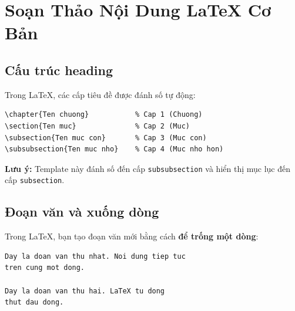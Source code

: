 
\chapter{Soạn Thảo Nội Dung \LaTeX{} Cơ Bản}
\label{ch:basics}

\section{Cấu trúc heading}

Trong \LaTeX{}, các cấp tiêu đề được đánh số tự động:

\begin{lstlisting}[style=latexstyle, caption={Các cấp tiêu đề}]
\chapter{Ten chuong}           % Cap 1 (Chuong)
\section{Ten muc}              % Cap 2 (Muc)
\subsection{Ten muc con}       % Cap 3 (Muc con)
\subsubsection{Ten muc nho}    % Cap 4 (Muc nho hon)
\end{lstlisting}

\textbf{Lưu ý:} Template này đánh số đến cấp \texttt{subsubsection} và hiển thị mục lục đến cấp \texttt{subsection}.

\section{Đoạn văn và xuống dòng}

Trong \LaTeX{}, bạn tạo đoạn văn mới bằng cách \textbf{để trống một dòng}:

\begin{lstlisting}[style=latexstyle, caption={Tạo đoạn văn mới}]
Day la doan van thu nhat. Noi dung tiep tuc
tren cung mot dong.

Day la doan van thu hai. LaTeX tu dong
thut dau dong.
\end{lstlisting}

